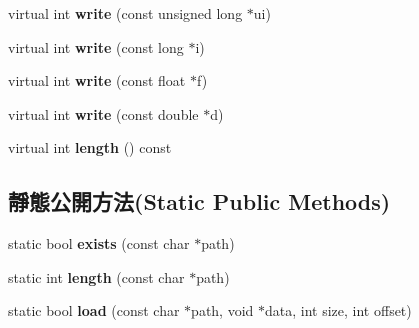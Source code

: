 \begin{DoxyCompactItemize}
\item 
virtual int {\bfseries write} (const unsigned long $\ast$ui)\hypertarget{class_i_dream_sky_1_1_file_i_o_a88ca8e5f612eef16681cd0b70ffe21fc}{}\label{class_i_dream_sky_1_1_file_i_o_a88ca8e5f612eef16681cd0b70ffe21fc}

\item 
virtual int {\bfseries write} (const long $\ast$i)\hypertarget{class_i_dream_sky_1_1_file_i_o_a49365592c093d659a73690f53adbd165}{}\label{class_i_dream_sky_1_1_file_i_o_a49365592c093d659a73690f53adbd165}

\item 
virtual int {\bfseries write} (const float $\ast$f)\hypertarget{class_i_dream_sky_1_1_file_i_o_a717fc13d45f26c79c44322b6c026655c}{}\label{class_i_dream_sky_1_1_file_i_o_a717fc13d45f26c79c44322b6c026655c}

\item 
virtual int {\bfseries write} (const double $\ast$d)\hypertarget{class_i_dream_sky_1_1_file_i_o_a2f5c857bb6d34d628fa076f6cada9395}{}\label{class_i_dream_sky_1_1_file_i_o_a2f5c857bb6d34d628fa076f6cada9395}

\item 
virtual int {\bfseries length} () const \hypertarget{class_i_dream_sky_1_1_file_i_o_ab8d1462bae8aaf71c9321aa72d0edf6f}{}\label{class_i_dream_sky_1_1_file_i_o_ab8d1462bae8aaf71c9321aa72d0edf6f}

\end{DoxyCompactItemize}
\subsection*{靜態公開方法(Static Public Methods)}
\begin{DoxyCompactItemize}
\item 
static bool {\bfseries exists} (const char $\ast$path)\hypertarget{class_i_dream_sky_1_1_file_i_o_a98e9c25720573d3f62ec26ef845a1f74}{}\label{class_i_dream_sky_1_1_file_i_o_a98e9c25720573d3f62ec26ef845a1f74}

\item 
static int {\bfseries length} (const char $\ast$path)\hypertarget{class_i_dream_sky_1_1_file_i_o_a677488f8333b28a1a929b928646d639d}{}\label{class_i_dream_sky_1_1_file_i_o_a677488f8333b28a1a929b928646d639d}

\item 
static bool {\bfseries load} (const char $\ast$path, void $\ast$data, int size, int offset)\hypertarget{class_i_dream_sky_1_1_file_i_o_a1272a9116e11892e432a0d2299aad208}{}\label{class_i_dream_sky_1_1_file_i_o_a1272a9116e11892e432a0d2299aad208}

\end{DoxyCompactItemize}
